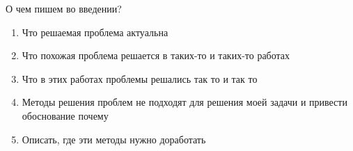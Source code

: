 О чем пишем во введении?

\begin{enumerate}
	\item Что решаемая проблема актуальна
	\item Что похожая проблема решается в таких-то и таких-то работах
	\item Что в этих работах проблемы решались так то и так то
	\item Методы решения проблем не подходят для решения моей задачи и привести обоснование почему
	\item Описать, где эти методы нужно доработать
\end{enumerate}